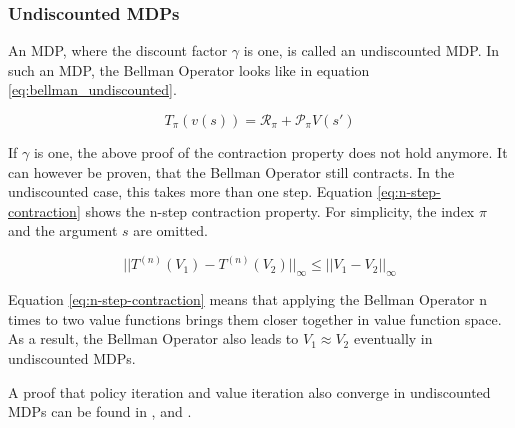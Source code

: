 \subsubsection{Undiscounted MDPs}

An MDP, where the discount factor $\gamma$ is one, is called an undiscounted MDP. In such an MDP, the Bellman Operator looks like in equation \ref{eq:bellman_undiscounted}.

\begin{equation}
T_\pi(v(s))=\mathcal{R}_\pi + \mathcal{P}_\pi V(s')
\label{eq:bellman_undiscounted}
\end{equation}

If $\gamma$ is one, the above proof of the contraction property does not hold anymore. It can however be proven, that the Bellman Operator still contracts. In the undiscounted case, this takes more than one step. Equation \ref{eq:n-step-contraction} shows the n-step contraction property. For simplicity, the index $\pi$ and the argument $s$ are omitted.

\begin{equation}
||T^{(n)}(V_1)-T^{(n)}(V_2)||_\infty \leq ||V_1-V_2||_\infty
\label{eq:n-step-contraction}
\end{equation}

Equation \ref{eq:n-step-contraction} means that applying the Bellman Operator n times to two value functions brings them closer together in value function space. As a result, the Bellman Operator also leads to $V_1 \approx V_2$ eventually in undiscounted MDPs.

A proof that policy iteration and value iteration also converge in undiscounted MDPs can be found in \cite{},\cite{} and \cite{}.

